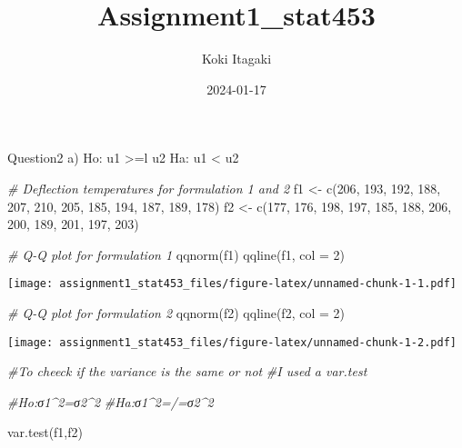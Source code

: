 \documentclass[
]{article}
\title{Assignment1\_stat453}
\author{Koki Itagaki}
\date{2024-01-17}
\newenvironment{Shaded}{\begin{snugshade}}{\end{snugshade}}
\newcommand{\AttributeTok}[1]{\textcolor[rgb]{0.77,0.63,0.00}{#1}}
\newcommand{\CommentTok}[1]{\textcolor[rgb]{0.56,0.35,0.01}{\textit{#1}}}
\newcommand{\DecValTok}[1]{\textcolor[rgb]{0.00,0.00,0.81}{#1}}
\newcommand{\FunctionTok}[1]{\textcolor[rgb]{0.00,0.00,0.00}{#1}}
\newcommand{\NormalTok}[1]{#1}
\newcommand{\OtherTok}[1]{\textcolor[rgb]{0.56,0.35,0.01}{#1}}
\begin{document}
\maketitle

Question2 a) Ho: u1 \textgreater=l u2 Ha: u1 \textless{} u2

\begin{Shaded}
\begin{Highlighting}[]
\CommentTok{\# Deflection temperatures for formulation 1 and 2}
\NormalTok{f1 }\OtherTok{\textless{}{-}} \FunctionTok{c}\NormalTok{(}\DecValTok{206}\NormalTok{, }\DecValTok{193}\NormalTok{, }\DecValTok{192}\NormalTok{, }\DecValTok{188}\NormalTok{, }\DecValTok{207}\NormalTok{, }\DecValTok{210}\NormalTok{, }\DecValTok{205}\NormalTok{, }\DecValTok{185}\NormalTok{, }\DecValTok{194}\NormalTok{, }\DecValTok{187}\NormalTok{, }\DecValTok{189}\NormalTok{, }\DecValTok{178}\NormalTok{)}
\NormalTok{f2 }\OtherTok{\textless{}{-}} \FunctionTok{c}\NormalTok{(}\DecValTok{177}\NormalTok{, }\DecValTok{176}\NormalTok{, }\DecValTok{198}\NormalTok{, }\DecValTok{197}\NormalTok{, }\DecValTok{185}\NormalTok{, }\DecValTok{188}\NormalTok{, }\DecValTok{206}\NormalTok{, }\DecValTok{200}\NormalTok{, }\DecValTok{189}\NormalTok{, }\DecValTok{201}\NormalTok{, }\DecValTok{197}\NormalTok{, }\DecValTok{203}\NormalTok{)}

\CommentTok{\# Q{-}Q plot for formulation 1}
\FunctionTok{qqnorm}\NormalTok{(f1)}
\FunctionTok{qqline}\NormalTok{(f1, }\AttributeTok{col =} \DecValTok{2}\NormalTok{)}
\end{Highlighting}
\end{Shaded}

\texttt{[image: assignment1\_stat453\_files/figure-latex/unnamed-chunk-1-1.pdf]}

\begin{Shaded}
\begin{Highlighting}[]
\CommentTok{\# Q{-}Q plot for formulation 2}
\FunctionTok{qqnorm}\NormalTok{(f2)}
\FunctionTok{qqline}\NormalTok{(f2, }\AttributeTok{col =} \DecValTok{2}\NormalTok{)}
\end{Highlighting}
\end{Shaded}

\texttt{[image: assignment1\_stat453\_files/figure-latex/unnamed-chunk-1-2.pdf]}

\begin{Shaded}
\begin{Highlighting}[]
\CommentTok{\#To cheeck if the variance is the same or not }
\CommentTok{\#I used a var.test}

\CommentTok{\#Ho:σ1\^{}2=σ2\^{}2}
\CommentTok{\#Ha:σ1\^{}2=/=σ2\^{}2}



\FunctionTok{var.test}\NormalTok{(f1,f2)}
\end{Highlighting}
\end{Shaded}
\end{document}
